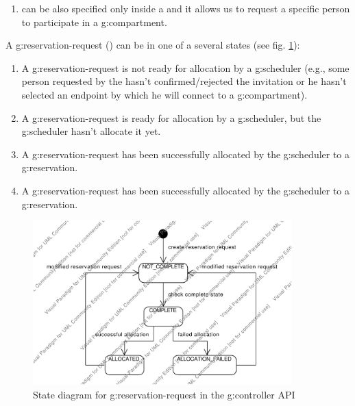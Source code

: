 \begin{enumerate}
\item {} can be also specified only inside a  and it allows us to request a specific person to participate in a \gls{g:compartment}.

\end{enumerate}

A \gls{g:reservation-request} () can be in one of a several states (see fig. \ref{fig:smd_api_reservation_request}):
\begin{enumerate}
\item {} A \gls{g:reservation-request} is not ready for allocation by a \gls{g:scheduler} (e.g., some person requested by the  hasn't confirmed/rejected the invitation or he hasn't selected an endpoint by which he will connect to a \gls{g:compartment}).
\item {} A \gls{g:reservation-request} is ready for allocation by a \gls{g:scheduler}, but the \gls{g:scheduler} hasn't allocate it yet.
\item {} A \gls{g:reservation-request} has been successfully allocated by the \gls{g:scheduler} to a \gls{g:reservation}.
\item {} A \gls{g:reservation-request} has been successfully allocated by the \gls{g:scheduler} to a \gls{g:reservation}.
\end{enumerate}

\begin{figure}[ht!]
\centering\includegraphics[width=10cm]{diagrams/smd_api_reservation_request}
\caption{State diagram for \gls{g:reservation-request} in the \gls{g:controller} API}
\label{fig:smd_api_reservation_request}
\end{figure}

